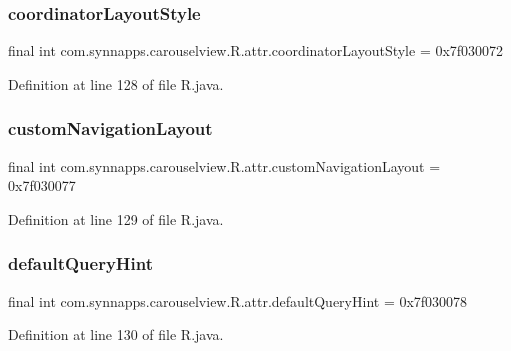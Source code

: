 \subsubsection{\texorpdfstring{coordinatorLayoutStyle}{coordinatorLayoutStyle}}
{\footnotesize\ttfamily final int com.\+synnapps.\+carouselview.\+R.\+attr.\+coordinator\+Layout\+Style = 0x7f030072\hspace{0.3cm}{\ttfamily [static]}}



Definition at line 128 of file R.\+java.

\mbox{\label{classcom_1_1synnapps_1_1carouselview_1_1_r_1_1attr_a991c9b6c652149bbf753b48aa7e97b28}} 
\subsubsection{\texorpdfstring{customNavigationLayout}{customNavigationLayout}}
{\footnotesize\ttfamily final int com.\+synnapps.\+carouselview.\+R.\+attr.\+custom\+Navigation\+Layout = 0x7f030077\hspace{0.3cm}{\ttfamily [static]}}



Definition at line 129 of file R.\+java.

\mbox{\label{classcom_1_1synnapps_1_1carouselview_1_1_r_1_1attr_aff7893bb0a956b02451a9edcf25306c6}} 
\subsubsection{\texorpdfstring{defaultQueryHint}{defaultQueryHint}}
{\footnotesize\ttfamily final int com.\+synnapps.\+carouselview.\+R.\+attr.\+default\+Query\+Hint = 0x7f030078\hspace{0.3cm}{\ttfamily [static]}}



Definition at line 130 of file R.\+java.

